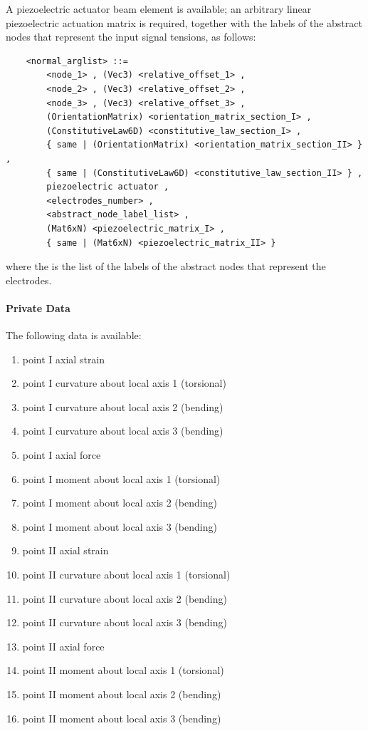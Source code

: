 \noindent
A piezoelectric actuator beam element is available; an arbitrary
linear piezoelectric actuation matrix is required, together with the labels
of the abstract nodes that represent the input signal tensions, as follows:
\begin{verbatim}
    <normal_arglist> ::=
        <node_1> , (Vec3) <relative_offset_1> ,
        <node_2> , (Vec3) <relative_offset_2> ,
        <node_3> , (Vec3) <relative_offset_3> ,
        (OrientationMatrix) <orientation_matrix_section_I> ,
        (ConstitutiveLaw6D) <constitutive_law_section_I> ,
        { same | (OrientationMatrix) <orientation_matrix_section_II> } ,
        { same | (ConstitutiveLaw6D) <constitutive_law_section_II> } ,
        piezoelectric actuator , 
        <electrodes_number> ,
        <abstract_node_label_list> ,
        (Mat6xN) <piezoelectric_matrix_I> ,
        { same | (Mat6xN) <piezoelectric_matrix_II> }
\end{verbatim}
where the  is the list of the labels of the
abstract nodes that represent the electrodes.


\paragraph{Private Data}
The following data is available:
\begin{enumerate}
\item {} point I axial strain
\setcounter{enumi}{3}
\item {} point I curvature about local axis 1 (torsional)
\item {} point I curvature about local axis 2 (bending)
\item {} point I curvature about local axis 3 (bending)
\item {} point I axial force
\setcounter{enumi}{9}
\item {} point I moment about local axis 1 (torsional)
\item {} point I moment about local axis 2 (bending)
\item {} point I moment about local axis 3 (bending)
\item {} point II axial strain
\setcounter{enumi}{15}
\item {} point II curvature about local axis 1 (torsional)
\item {} point II curvature about local axis 2 (bending)
\item {} point II curvature about local axis 3 (bending)
\item {} point II axial force
\setcounter{enumi}{21}
\item {} point II moment about local axis 1 (torsional)
\item {} point II moment about local axis 2 (bending)
\item {} point II moment about local axis 3 (bending)
\end{enumerate}









